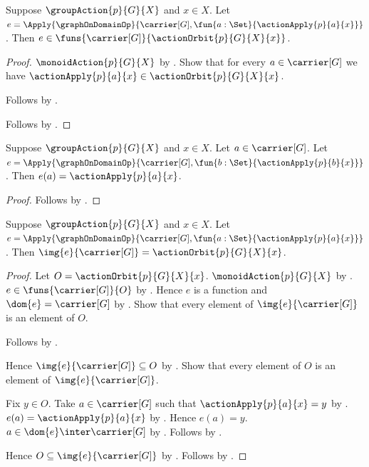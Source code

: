 \begin{lemma}\label{orbit_stabilizer_source_type}
    Suppose $\groupAction{p}{G}{X}$ and $x\in X$.
    Let
        $e=\Apply{\graphOnDomainOp}{
            \carrier[G],\fun{a:\Set}{\actionApply{p}{a}{x}}}$.
    Then $e\in\funs{\carrier[G]}{\actionOrbit{p}{G}{X}{x}}$.
\end{lemma}
\begin{proof}
    $\monoidAction{p}{G}{X}$ by
        .
    Show that for every $a\in\carrier[G]$ we have
        $\actionApply{p}{a}{x}\in\actionOrbit{p}{G}{X}{x}$.
    \begin{subproof}
        Follows by .
    \end{subproof}
    Follows by .
\end{proof}

\begin{proposition}\label{orbit_stabilizer_source_apply}
    Suppose $\groupAction{p}{G}{X}$ and $x\in X$.
    Let $a\in\carrier[G]$.
    Let
        $e=\Apply{\graphOnDomainOp}{
            \carrier[G],\fun{b:\Set}{\actionApply{p}{b}{x}}}$.
    Then $e(a)=\actionApply{p}{a}{x}$.
\end{proposition}
\begin{proof}
    Follows by .
\end{proof}

\begin{proposition}\label{orbit_stabilizer_source_image}
    Suppose $\groupAction{p}{G}{X}$ and $x\in X$.
    Let
        $e=\Apply{\graphOnDomainOp}{
            \carrier[G],\fun{a:\Set}{\actionApply{p}{a}{x}}}$.
    Then $\img{e}{\carrier[G]}=\actionOrbit{p}{G}{X}{x}$.
\end{proposition}
\begin{proof}
    Let $O=\actionOrbit{p}{G}{X}{x}$.
    $\monoidAction{p}{G}{X}$ by
        .
    $e\in\funs{\carrier[G]}{O}$ by
        .
    Hence $e$ is a function and $\dom{e}=\carrier[G]$ by
        .
    Show that every element of $\img{e}{\carrier[G]}$ is an element
        of $O$.
    \begin{subproof}
        Follows by .
    \end{subproof}
    Hence $\img{e}{\carrier[G]}\subseteq O$ by .
    Show that every element of $O$ is an element of
        $\img{e}{\carrier[G]}$.
    \begin{subproof}
        Fix $y\in O$.
        Take $a\in\carrier[G]$ such that
            $\actionApply{p}{a}{x}=y$ by .
        $e(a)=\actionApply{p}{a}{x}$ by
            .
        Hence $e(a)=y$.
        $a\in\dom{e}\inter\carrier[G]$ by .
        Follows by .
    \end{subproof}
    Hence $O\subseteq\img{e}{\carrier[G]}$ by .
    Follows by .
\end{proof}


